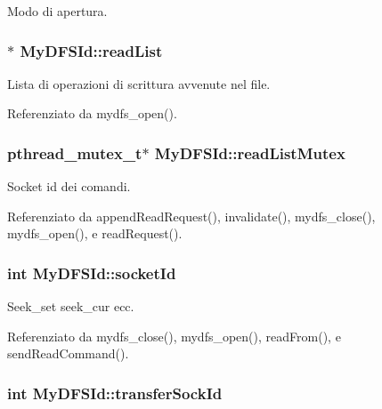 Modo di apertura. 

\hypertarget{structMyDFSId_a8a4360512d45c22b6d8e980967c7dd32}{
\subsubsection[{read\+List}]{$\ast$ My\+D\+F\+S\+Id\+::read\+List}}\label{structMyDFSId_a8a4360512d45c22b6d8e980967c7dd32}


Lista di operazioni di scrittura avvenute nel file. 



Referenziato da mydfs\+\_\+open().

\hypertarget{structMyDFSId_a71f51c82d7133bfc16fcffeb4c395da0}{
\subsubsection[{read\+List\+Mutex}]{\setlength{\rightskip}{0pt plus 5cm}pthread\+\_\+mutex\+\_\+t$\ast$ My\+D\+F\+S\+Id\+::read\+List\+Mutex}}\label{structMyDFSId_a71f51c82d7133bfc16fcffeb4c395da0}


Socket id dei comandi. 



Referenziato da append\+Read\+Request(), invalidate(), mydfs\+\_\+close(), mydfs\+\_\+open(), e read\+Request().

\hypertarget{structMyDFSId_a382a74f109962751085cea7aac2892cc}{
\subsubsection[{socket\+Id}]{\setlength{\rightskip}{0pt plus 5cm}int My\+D\+F\+S\+Id\+::socket\+Id}}\label{structMyDFSId_a382a74f109962751085cea7aac2892cc}


Seek\+\_\+set seek\+\_\+cur ecc. 



Referenziato da mydfs\+\_\+close(), mydfs\+\_\+open(), read\+From(), e send\+Read\+Command().

\hypertarget{structMyDFSId_a3b62a6d0f52a871bda4bf9cd56c57ff7}{
\subsubsection[{transfer\+Sock\+Id}]{\setlength{\rightskip}{0pt plus 5cm}int My\+D\+F\+S\+Id\+::transfer\+Sock\+Id}}\label{structMyDFSId_a3b62a6d0f52a871bda4bf9cd56c57ff7}


